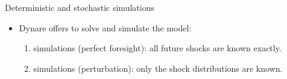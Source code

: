 \begin{frame}{Deterministic and stochastic simulations}
	\begin{itemize}
	    \item Dynare offers  to solve and simulate the model:
	    \begin{enumerate}
            \item {} simulations (perfect foresight):  all future shocks are known exactly.
	       \item {} simulations (perturbation):  only the shock distributions are known.
        \end{enumerate}
%

\end{itemize}
\end{frame}

